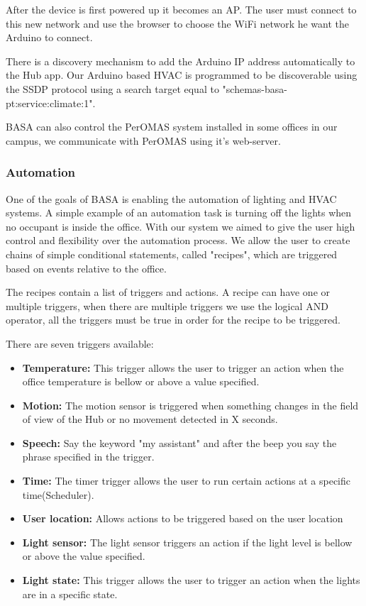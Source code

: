 \documentclass[conference]{IEEEtran}
\begin{document}
After the device is first powered up it becomes an \ac{AP}. The user must connect to this new network and use the browser to choose the \ac{WiFi} network he want the Arduino to connect.

There is a discovery mechanism to add the Arduino IP address automatically to the Hub app. Our Arduino based HVAC is programmed to be discoverable using the \ac{SSDP} protocol using a search target equal to "schemas-basa-pt:service:climate:1".

BASA can also control the PerOMAS system installed in some offices in our campus, we communicate with PerOMAS using it's web-server.

\subsubsection{Automation}

One of the goals of BASA is enabling the automation of lighting and \ac{HVAC} systems. A simple example of an automation task is turning off the lights when no occupant is inside the office.
With our system we aimed to give the user high control and flexibility over the automation process. We allow the user to create chains of simple conditional statements, called "recipes", which are triggered based on events relative to the office.

The recipes contain a list of triggers and actions. A recipe can have one or multiple triggers, when there are multiple triggers we use the logical AND operator, all the triggers must be true in order for the recipe to be triggered.

There are seven triggers available:

\begin{itemize}
  \item \textbf{Temperature:} This trigger allows the user to trigger an action when the office temperature is bellow or above a value specified.
  \item \textbf{Motion:} The motion sensor is triggered when something changes in the field of view of the Hub or no movement detected in X seconds.
  \item \textbf{Speech:} Say the keyword "my assistant" and after the beep you say the phrase specified in the trigger.  
  \item \textbf{Time:} The timer trigger allows the user to run certain actions at a specific time(Scheduler).  
  \item \textbf{User location:} Allows actions to be triggered based on the user location
  \item \textbf{Light sensor:} The light sensor triggers an action if the light level is bellow or above the value specified.
  \item \textbf{Light state:} This trigger allows the user to trigger an action when the lights are in a specific state.
  
\end{itemize}
\end{document}
